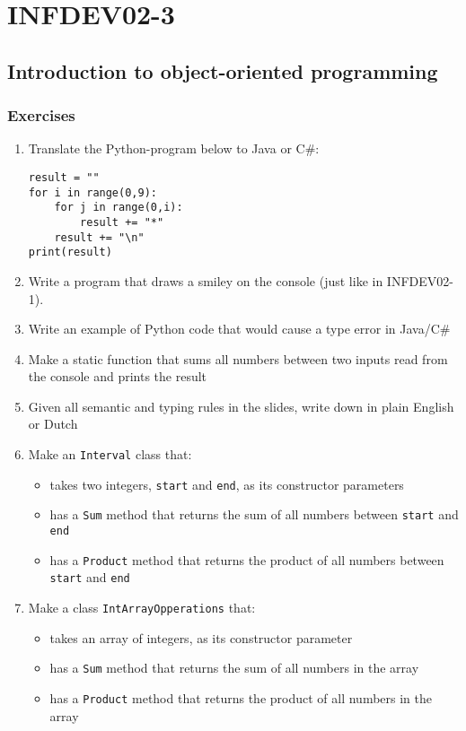 \setcounter{part}{3}
\part{INFDEV02-3}
\setcounter{chapter}{0}
\chapter{Introduction to object-oriented programming}

    \section{Exercises}
        \begin{enumerate}
            \item Translate the Python-program below to Java or C\#:
            \begin{lstlisting}
result = ""
for i in range(0,9):
    for j in range(0,i):
        result += "*"
    result += "\n"
print(result)
            \end{lstlisting}

            \item Write a program that draws a smiley on the console (just like in INFDEV02-1).
            \item Write an example of Python code that would cause a type error in Java/C\#
            \item Make a static function that sums all numbers between two inputs read from the console and prints the result

            \item Given all semantic and typing rules in the slides, write down in plain English or Dutch
            \item Make an \texttt{Interval} class that:
            \begin{itemize}
                \item takes two integers, \texttt{start} and \texttt{end}, as its constructor parameters
                \item has a \texttt{Sum} method that returns the sum of all numbers between \texttt{start} and \texttt{end}
                \item has a \texttt{Product} method that returns the product of all numbers between \texttt{start} and \texttt{end}
            \end{itemize}

            \item Make a class \texttt{IntArrayOpperations} that:
            \begin{itemize}
                \item takes an array of integers, as its constructor parameter
                \item has a \texttt{Sum} method that returns the sum of all numbers in the array
                \item has a \texttt{Product} method that returns the product of all numbers in the array
            \end{itemize}


\end{enumerate}
